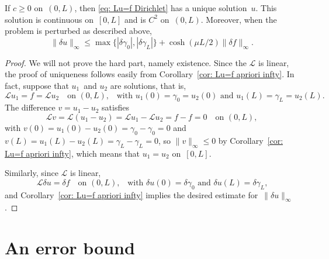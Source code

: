 \begin{theorem}
If $c\ge0$ on~$(0,L)$, then \eqref{eq: Lu=f Dirichlet} has a unique 
solution~$u$.  This solution is continuous on~$[0,L]$ and is $C^2$ on~$(0,L)$.
Moreover, when the problem is perturbed as described above, 
\[
\|\delta u\|_\infty\le\max\{|\delta\gamma_0|,|\delta\gamma_L|\}
	+\cosh(\mu L/2)\|\delta f\|_\infty.
\]
\end{theorem}
\begin{proof}
We will not prove the hard part, namely existence.  Since the $\mathcal{L}$ is 
linear, the proof of uniqueness follows easily from 
Corollary~\ref{cor: Lu=f apriori infty}.  In fact, suppose that $u_1$~and $u_2$ 
are solutions, that is,
\[
\mathcal{L}u_1=f=\mathcal{L}u_2\quad\text{on $(0,L)$,}
	\quad\text{with $u_1(0)=\gamma_0=u_2(0)$ and $u_1(L)=\gamma_L=u_2(L)$.}
\]
The difference $v=u_1-u_2$ satisfies
\[
\mathcal{L}v=\mathcal{L}(u_1-u_2)=\mathcal{L}u_1-\mathcal{L}u_2=f-f=0
	\quad\text{on $(0,L)$},
\]
with $v(0)=u_1(0)-u_2(0)=\gamma_0-\gamma_0=0$ and
$v(L)=u_1(L)-u_2(L)=\gamma_L-\gamma_L=0$, so $\|v\|_\infty\le0$ by 
Corollary~\ref{cor: Lu=f apriori infty}, which means that $u_1=u_2$ on~$[0,L]$.

Similarly, since $\mathcal{L}$ is linear,
\[
\mathcal{L}\delta u=\delta f\quad\text{on $(0,L)$,}
	\quad\text{with $\delta u(0)=\delta\gamma_0$ 
and $\delta u(L)=\delta\gamma_L$,}
\]
and Corollary~\ref{cor: Lu=f apriori infty} implies the desired estimate 
for~$\|\delta u\|_\infty$.
\end{proof}

\section{An error bound}
